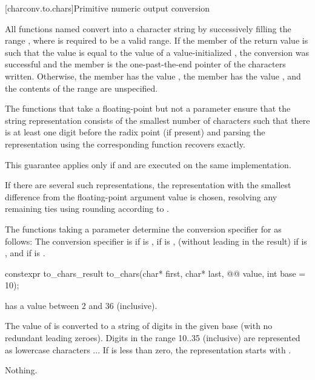 [charconv.to.chars]{Primitive numeric output conversion}

\pnum
All functions named 
convert  into a character string
by successively filling the range
,
where  is required to be a valid range.
If the member 
of the return value
is such that the value
is equal to the value of a value-initialized ,
the conversion was successful
and the member 
is the one-past-the-end pointer of the characters written.
Otherwise,
the member  has the value ,
the member  has the value ,
and the contents of the range  are unspecified.

\pnum
The functions that take a floating-point 
but not a  parameter
ensure that the string representation
consists of the smallest number of characters
such that
there is at least one digit before the radix point (if present) and
parsing the representation using the corresponding  function
recovers  exactly.
\begin{note}
This guarantee applies only if
 and 
are executed on the same implementation.
\end{note}
If there are several such representations,
the representation with the smallest difference from
the floating-point argument value is chosen,
resolving any remaining ties using rounding according to
.

\pnum
The functions taking a  parameter
determine the conversion specifier for  as follows:
The conversion specifier is
 if  is ,
 if  is ,
 (without leading  in the result)
if  is ,
and
 if  is .

%
\begin{itemdecl}
constexpr to_chars_result to_chars(char* first, char* last, @@ value, int base = 10);
\end{itemdecl}

\begin{itemdescr}
\pnum
\expects
{} has a value between 2 and 36 (inclusive).

\pnum
\effects
The value of  is converted
to a string of digits in the given base
(with no redundant leading zeroes).
Digits in the range 10..35 (inclusive)
are represented as lowercase characters ...
If  is less than zero,
the representation starts with .

\pnum
\throws
Nothing.
\end{itemdescr}

